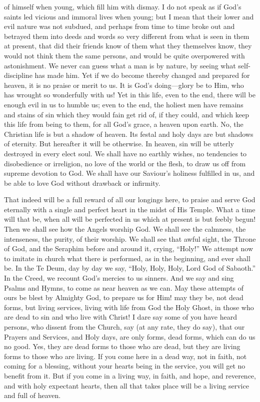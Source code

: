 of himself when young, which fill him with dismay. I do not speak as
if God's saints led vicious and immoral lives when young; but I mean
that their lower and evil nature was not subdued, and perhaps from
time to time broke out and betrayed them into deeds and words so very
different from what is seen in them at present, that did their friends
know of them what they themselves know, they would not think them the
same persons, and would be quite overpowered with astonishment. We
never can guess what a man is by nature, by seeing what
self-discipline has made him. Yet if we do become thereby changed and
prepared for heaven, it is no praise or merit to us. It is God's doing—glory
be to Him, who has wrought so wonderfully with us! Yet in this life,
even to the end, there will be enough evil in us to humble us; even to
the end, the holiest men have remains and stains of sin which they
would fain get rid of, if they could, and which keep this life from
being to them, for all God's grace, a heaven upon earth. No, the
Christian life is but a shadow of heaven. Its festal and holy days are
but shadows of eternity. But hereafter it will be otherwise. In
heaven, sin will be utterly destroyed in every elect soul. We shall
have no earthly wishes, no tendencies to disobedience or irreligion,
no love of the world or the flesh, to draw us off from supreme
devotion to God. We shall have our Saviour's holiness fulfilled in us,
and be able to love God without drawback or infirmity.

That indeed will be a full reward of all our longings here, to
praise and serve God eternally with a single and perfect heart in the
midst of His Temple. What a time will that be, when all will be
perfected in us which at present is but feebly begun! Then we shall
see how the Angels worship God. We shall see the calmness, the
intenseness, the purity, of their worship. We shall see that awful
sight, the Throne of God, and the Seraphim before and around it,
crying, ``Holy!'' We attempt now to imitate in church what
there is performed, as in the beginning, and ever shall be. In the Te
Deum, day by day we say, ``Holy, Holy, Holy, Lord God of Sabaoth.''
In the Creed, we recount God's mercies to us sinners. And we say and
sing Psalms and Hymns, to come as near heaven as we can. May these
attempts of ours be blest by Almighty God, to prepare us for Him! may
they be, not dead forms, but living services, living with life from
God the Holy Ghost, in those who are dead to sin and who live with
Christ! I dare say some of you have heard persons, who dissent from
the Church, say (at any rate, they do say), that our Prayers and
Services, and Holy days, are only forms, dead forms, which can do us
no good. Yes, they are dead forms to those who are dead, but they are
living forms to those who are living. If you come here in a dead way,
not in faith, not coming for a blessing, without your hearts being in
the service, you will get no benefit from it. But if you come in a
living way, in faith, and hope, and reverence, and with holy expectant
hearts, then all that takes place will be a living service and full of
heaven.

